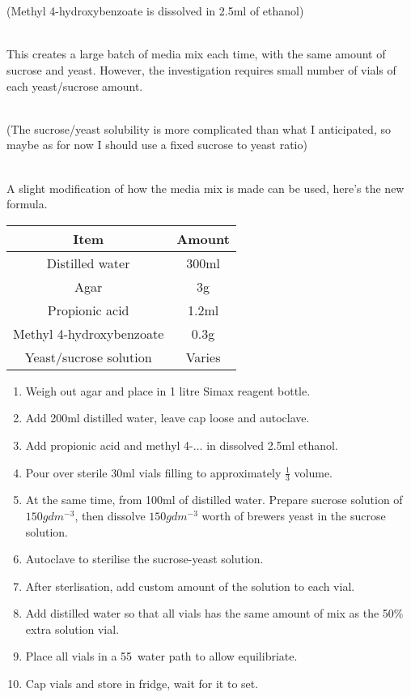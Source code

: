 \documentclass{article}
\begin{document}
\noindent\\\\
(Methyl 4-hydroxybenzoate is dissolved in 2.5ml of ethanol)

\noindent\\
This creates a large batch of media mix each time, with the same amount of sucrose and yeast. However, the investigation requires small number of vials of each yeast/sucrose amount.

\noindent\\
(The sucrose/yeast solubility is more complicated than what I anticipated, so maybe as for now I should use a fixed sucrose to yeast ratio)

\noindent\\
A slight modification of how the media mix is made can be used, here's the new formula.

{
\centering
\begin{tabular}{|c|c|}
  \hline
  Item & Amount\\
  \hline
  \hline
  Distilled water & 300ml\\
  Agar & 3g\\
  Propionic acid & 1.2ml\\
  Methyl 4-hydroxybenzoate & 0.3g\\
  Yeast/sucrose solution & Varies\\
  \hline
\end{tabular}
\par
}

\begin{enumerate}
  \item Weigh out agar and place in 1 litre Simax reagent bottle.
  \item Add 200ml distilled water, leave cap loose and autoclave.
  \item Add propionic acid and methyl 4-$\dots$ in dissolved 2.5ml ethanol.
  \item Pour over sterile 30ml vials filling to approximately $\frac{1}{3}$ volume.
  \item At the same time, from 100ml of distilled water. Prepare sucrose solution of $150gdm^{-3}$, then dissolve $150gdm^{-3}$ worth of brewers yeast in the sucrose solution.
  \item Autoclave to sterilise the sucrose-yeast solution.
  \item After sterlisation, add custom amount of the solution to each vial.
  \item Add distilled water so that all vials has the same amount of mix as the 50\% extra solution vial.
  \item Place all vials in a 55\textcelsius~water path to allow equilibriate.
  \item Cap vials and store in fridge, wait for it to set.
\end{enumerate}
\end{document}
